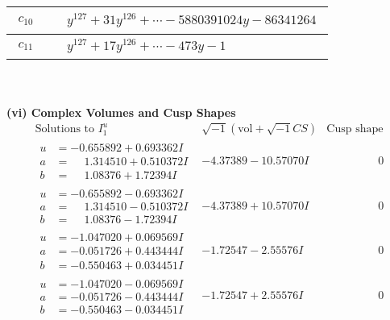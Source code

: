 \documentclass[1p]{elsarticle_modified}
\theoremstyle{definition}
\newcommand{\I}{\sqrt{-1}}
\begin{document}
\begin{tabular}{m{50pt}|m{274pt}}
\hline $$\begin{aligned}c_{10}\end{aligned}$$&$\begin{aligned}
&y^{127}+31 y^{126}+\cdots-5880391024 y-86341264
\end{aligned}$\\
\hline $$\begin{aligned}c_{11}\end{aligned}$$&$\begin{aligned}
&y^{127}+17 y^{126}+\cdots-473 y-1
\end{aligned}$\\
\hline
\end{tabular}\\~\\
\newpage\flushleft \textbf{(vi) Complex Volumes and Cusp Shapes}
$$\begin{array}{c|c|c}  
\text{Solutions to }I^u_{1}& \I (\text{vol} + \sqrt{-1}CS) & \text{Cusp shape}\\
 \hline 
\begin{aligned}
u &= -0.655892 + 0.693362 I \\
a &= \phantom{-}1.314510 + 0.510372 I \\
b &= \phantom{-}1.08376 + 1.72394 I\end{aligned}
 & -4.37389 - 10.57070 I & \phantom{-0.000000 } 0 \\ \hline\begin{aligned}
u &= -0.655892 - 0.693362 I \\
a &= \phantom{-}1.314510 - 0.510372 I \\
b &= \phantom{-}1.08376 - 1.72394 I\end{aligned}
 & -4.37389 + 10.57070 I & \phantom{-0.000000 } 0 \\ \hline\begin{aligned}
u &= -1.047020 + 0.069569 I \\
a &= -0.051726 + 0.443444 I \\
b &= -0.550463 + 0.034451 I\end{aligned}
 & -1.72547 - 2.55576 I & \phantom{-0.000000 } 0 \\ \hline\begin{aligned}
u &= -1.047020 - 0.069569 I \\
a &= -0.051726 - 0.443444 I \\
b &= -0.550463 - 0.034451 I\end{aligned}
 & -1.72547 + 2.55576 I & \phantom{-0.000000 } 0 \\ \hline\begin{aligned}

\end{aligned}
\end{array}$$
\end{document}
